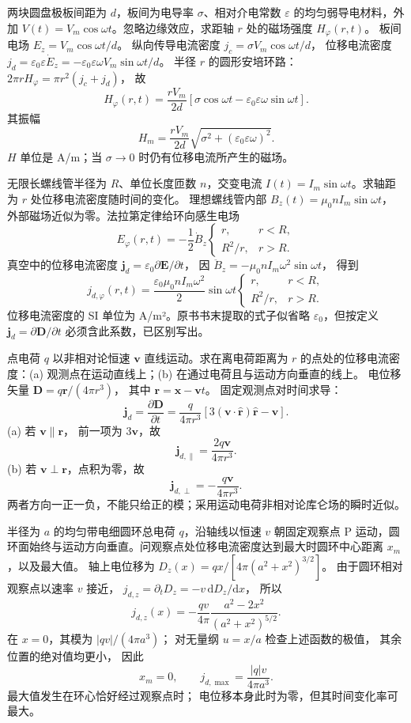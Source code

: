 两块圆盘极板间距为 $d$，板间为电导率 $\sigma$、相对介电常数 $\varepsilon$ 的均匀弱导电材料，外加
$V(t)=V_m\cos\omega t$。忽略边缘效应，求距轴 $r$ 处的磁场强度 $H_\varphi(r,t)$。
\exsolution
板间电场
$E_z=V_m\cos\omega t/d$。
纵向传导电流密度
$j_c=\sigma V_m\cos\omega t/d$，
位移电流密度
$j_d=\varepsilon_0\varepsilon\dot E_z
=-\varepsilon_0\varepsilon\omega V_m\sin\omega t/d$。
半径 $r$ 的圆形安培环路：
$2\pi rH_\varphi=\pi r^2(j_c+j_d)$，
故
\[
\boxed{H_\varphi(r,t)=\frac{rV_m}{2d}
[\sigma\cos\omega t-
\varepsilon_0\varepsilon\omega\sin\omega t]}.
\]
其振幅
\[
\boxed{H_m=\frac{rV_m}{2d}
\sqrt{\sigma^2+(\varepsilon_0\varepsilon\omega)^2}}.
\]
\excheck $H$ 单位是 A/m；当 $\sigma\to0$ 时仍有位移电流所产生的磁场。

无限长螺线管半径为 $R$、单位长度匝数 $n$，交变电流
$I(t)=I_m\sin\omega t$。求轴距为 $r$ 处位移电流密度随时间的变化。
\exsolution
理想螺线管内部
$B_z(t)=\mu_0nI_m\sin\omega t$，
外部磁场近似为零。法拉第定律给环向感生电场
\[
E_\varphi(r,t)=
-\frac12\dot B_z
\begin{cases}r,&r<R,\\R^2/r,&r>R.\end{cases}
\]
真空中的位移电流密度
$\bm j_d=\varepsilon_0\partial\bm E/\partial t$，
因
$\ddot B_z=-\mu_0nI_m\omega^2\sin\omega t$，
得到
\[
\boxed{j_{d,\varphi}(r,t)=
\frac{\varepsilon_0\mu_0nI_m\omega^2}{2}
\sin\omega t
\begin{cases}r,&r<R,\\R^2/r,&r>R.\end{cases}}
\]
\excheck 位移电流密度的 SI 单位为 A/m²。原书书末提取的式子似省略 $\varepsilon_0$，但按定义 $\bm j_d=\partial\bm D/\partial t$ 必须含此系数，已区别写出。

点电荷 $q$ 以非相对论恒速 $\bm v$ 直线运动。求在离电荷距离为 $r$ 的点处的位移电流密度：(a) 观测点在运动直线上；(b) 在通过电荷且与运动方向垂直的线上。
\exsolution
电位移矢量
$\bm D=q\bm r/(4\pi r^3)$，
其中 $\bm r=\bm x-\bm vt$。
固定观测点对时间求导：
\[
\bm j_d=\frac{\partial\bm D}{\partial t}
=\frac q{4\pi r^3}
\left[3(\bm v\cdot\hat{\bm r})\hat{\bm r}-\bm v\right].
\]
(a) 若 $\bm v\parallel\bm r$，
前一项为 $3\bm v$，故
\[
\boxed{\bm j_{d,\parallel}=\frac{2q\bm v}{4\pi r^3}}.
\]
(b) 若 $\bm v\perp\bm r$，点积为零，故
\[
\boxed{\bm j_{d,\perp}=-\frac{q\bm v}{4\pi r^3}}.
\]
\excheck 两者方向一正一负，不能只给正的模；采用运动电荷非相对论库仑场的瞬时近似。

半径为 $a$ 的均匀带电细圆环总电荷 $q$，沿轴线以恒速 $v$ 朝固定观察点 P 运动，圆环面始终与运动方向垂直。问观察点处位移电流密度达到最大时圆环中心距离 $x_m$，以及最大值。
\exsolution
轴上电位移为
$D_z(x)=qx/[4\pi(a^2+x^2)^{3/2}]$。
由于圆环相对观察点以速率 $v$ 接近，
$j_{d,z}=\partial_t D_z=-v\,\mathrm dD_z/\mathrm dx$，
所以
\[
j_{d,z}(x)=
-\frac{qv}{4\pi}\frac{a^2-2x^2}{(a^2+x^2)^{5/2}}.
\]
在 $x=0$，其模为 $|qv|/(4\pi a^3)$；
对无量纲 $u=x/a$ 检查上述函数的极值，
其余位置的绝对值均更小，
因此
\[
\boxed{x_m=0,\qquad
j_{d,\max}=\frac{|q|v}{4\pi a^3}}.
\]
\excheck 最大值发生在环心恰好经过观察点时；
电位移本身此时为零，但其时间变化率可最大。

